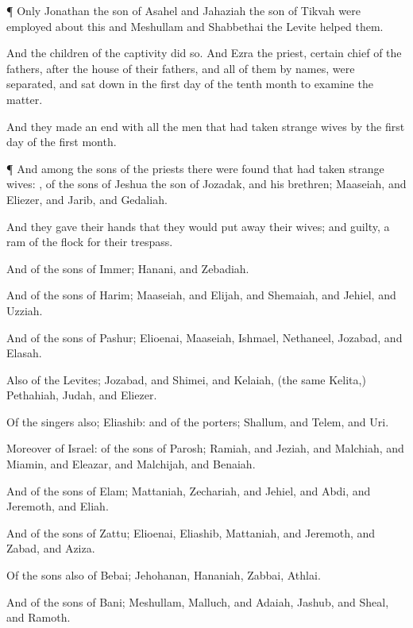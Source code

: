 {\par }{\PP {}¶ Only
Jonathan the
son of
Asahel and
Jahaziah the
son of
Tikvah were
employed about this
{} and
Meshullam and
Shabbethai the
Levite
helped them.

And the
children of the
captivity did
so. And
Ezra the
priest,
{}
certain
chief of the
fathers, after the
house of their
fathers, and all of them by
{}
names, were
separated, and sat
down in the
first
day of the
tenth
month to
examine the
matter.

And they made an
end with all the
men that had
taken
strange
wives by the
first
day of the
first
month.


\par }{\PP {}¶ And among the
sons of the
priests there were
found that had
taken
strange
wives:
{}, of the
sons of
Jeshua the
son of
Jozadak, and his
brethren;
Maaseiah, and
Eliezer, and
Jarib, and
Gedaliah.

And they
gave their
hands that they would put
away their
wives; and
{}
guilty,
{} a
ram of the
flock for their
trespass.

And of the
sons of
Immer;
Hanani, and
Zebadiah.

And of the
sons of
Harim;
Maaseiah, and
Elijah, and
Shemaiah, and
Jehiel, and
Uzziah.

And of the
sons of
Pashur;
Elioenai,
Maaseiah,
Ishmael,
Nethaneel,
Jozabad, and
Elasah.

Also of the
Levites;
Jozabad, and
Shimei, and
Kelaiah, (the same
{}
Kelita,)
Pethahiah,
Judah, and
Eliezer.

Of the
singers also;
Eliashib: and of the
porters;
Shallum, and
Telem, and
Uri.

Moreover of
Israel: of the
sons of
Parosh;
Ramiah, and
Jeziah, and
Malchiah, and
Miamin, and
Eleazar, and
Malchijah, and
Benaiah.

And of the
sons of
Elam;
Mattaniah,
Zechariah, and
Jehiel, and
Abdi, and
Jeremoth, and
Eliah.

And of the
sons of
Zattu;
Elioenai,
Eliashib,
Mattaniah, and
Jeremoth, and
Zabad, and
Aziza.

Of the
sons also of
Bebai;
Jehohanan,
Hananiah,
Zabbai,
{}
Athlai.

And of the
sons of
Bani;
Meshullam,
Malluch, and
Adaiah,
Jashub, and
Sheal, and
Ramoth.

}
